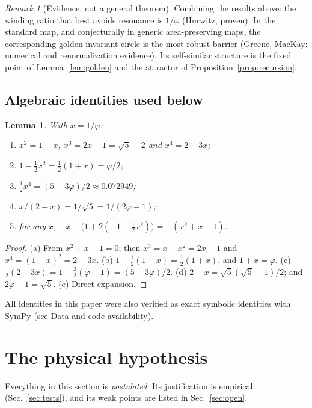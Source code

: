 \documentclass[11pt]{article}
\newtheorem{lemma}{Lemma}
\theoremstyle{definition}
\theoremstyle{remark}
\newtheorem{remark}{Remark}
\newcommand{\gr}{\varphi}
\begin{document}
\begin{remark}[Evidence, not a general theorem]\label{rem:golden}
Combining the results above: the winding ratio that best avoids resonance is $1/\gr$ (Hurwitz, proven). In the standard map, and conjecturally in generic area-preserving maps, the corresponding golden invariant circle is the most robust barrier (Greene, MacKay: numerical and renormalization evidence). Its self-similar structure is the fixed point of Lemma~\ref{lem:golden} and the attractor of Proposition~\ref{prop:recursion}.
\end{remark}

\subsection{Algebraic identities used below}

\begin{lemma}\label{lem:identities}
With $x = 1/\gr$:
\begin{enumerate}
\item[(a)] $x^2 = 1 - x$, $x^3 = 2x - 1 = \sqrt5 - 2$ and $x^4 = 2 - 3x$;
\item[(b)] $1 - \tfrac12 x^2 = \tfrac12(1+x) = \gr/2$;
\item[(c)] $\tfrac12 x^4 = (5 - 3\gr)/2 \approx 0.072949$;
\item[(d)] $x/(2-x) = 1/\sqrt5 = 1/(2\gr - 1)$;
\item[(e)] for any $x$, $-x - \bigl(1 + 2(-1 + \tfrac12 x^2)\bigr) = -(x^2 + x - 1)$.
\end{enumerate}
\end{lemma}
\begin{proof}
(a) From $x^2 + x - 1 = 0$; then $x^3 = x - x^2 = 2x - 1$ and $x^4 = (1-x)^2 = 2 - 3x$.
(b) $1 - \tfrac12(1-x) = \tfrac12(1+x)$, and $1 + x = \gr$.
(c) $\tfrac12(2 - 3x) = 1 - \tfrac32(\gr - 1) = (5 - 3\gr)/2$.
(d) $2 - x = \sqrt5(\sqrt5-1)/2$; and $2\gr - 1 = \sqrt5$.
(e) Direct expansion.
\end{proof}

All identities in this paper were also verified as exact symbolic identities with SymPy (see Data and code availability).

\section{The physical hypothesis}\label{sec:hyp}

Everything in this section is \emph{postulated}. Its justification is empirical (Sec.~\ref{sec:tests}), and its weak points are listed in Sec.~\ref{sec:open}.
\end{document}
